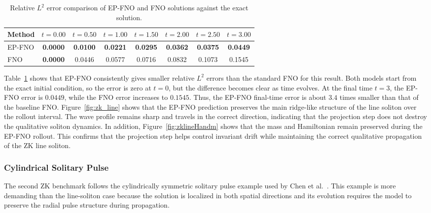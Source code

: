 \documentclass[11pt,a4paper]{article}
\theoremstyle{definition}
\theoremstyle{remark}
\numberwithin{equation}{section}
\numberwithin{figure}{section}
\numberwithin{table}{section}
\begin{document}
\begin{table}[H]
\centering
\caption{Relative $L^2$ error comparison of EP-FNO and FNO solutions against the exact solution.}
\label{tab:epfno_fno_line_soliton_l2_error_comparison}
\renewcommand{\arraystretch}{1.15}
\begin{tabular}{lccccccc}
\toprule[1.5pt]
\textbf{Method}   
& \textbf{$t=0.00$} & \textbf{$t=0.50$} & \textbf{$t=1.00$} & \textbf{$t=1.50$} 
& \textbf{$t=2.00$} & \textbf{$t=2.50$} & \textbf{$t=3.00$} \\
\midrule[1.2pt]
EP-FNO  
& \textbf{0.0000} & \textbf{0.0100} & \textbf{0.0221} 
& \textbf{0.0295} & \textbf{0.0362} & \textbf{0.0375} 
& \textbf{0.0449} \\

FNO  
& \textbf{0.0000} & 0.0446 & 0.0577 & 0.0716 
& 0.0832 & 0.1073 & 0.1545 \\
\bottomrule[1.5pt]
\end{tabular}
\end{table}

Table~\ref{tab:epfno_fno_line_soliton_l2_error_comparison} shows that EP-FNO consistently gives smaller relative $L^2$ errors than the standard FNO for this result. Both models start from the exact initial condition, so the error is zero at $t=0$, but the difference becomes clear as time evolves. At the final time $t=3$, the EP-FNO error is $0.0449$, while the FNO error increases to $0.1545$. Thus, the EP-FNO final-time error is about $3.4$ times smaller than that of the baseline FNO.
Figure~\ref{fig:zk_line} shows that the EP-FNO prediction preserves the main ridge-like
structure of the line soliton over the rollout interval. The wave profile remains sharp
and travels in the correct direction, indicating that the projection step does not
destroy the qualitative soliton dynamics. In addition, Figure~\ref{fig:zklineHandm}
shows that the mass and Hamiltonian remain preserved during the EP-FNO rollout. This
confirms that the projection step helps control invariant drift while maintaining the
correct qualitative propagation of the ZK line soliton.


\subsubsection*{Cylindrical Solitary Pulse}
The second ZK benchmark follows the cylindrically symmetric solitary pulse example used
by Chen et al.~\cite{chen2011multi}. This example is more demanding than the line-soliton
case because the solution is localized in both spatial directions and its evolution
requires the model to preserve the radial pulse structure during propagation.
\end{document}
